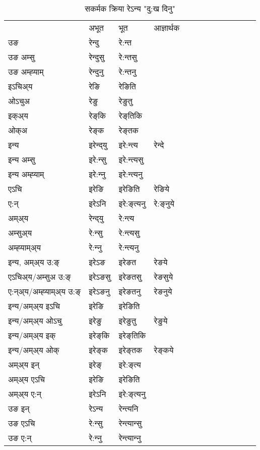 \begin{table}[H]
\label{eŋt.vt} \centering
\caption{सकर्मक क्रिया  रेऽन्य  "दु:ख दिनु"  }
\begin{tabular}{l|l|l|l|l|l|l|l|l|l|l|l|l}  \toprule
&अभूत & भूत & आज्ञार्थक \\ 
उङ &रेन्दु &रे:न्त \\ 
उङ अम्सु&रेन्दुसु &रे:न्तसु \\ 
उङ अम्ह्‍याम्&रेन्दुनु &रे:न्तनु \\ 
इऽचिअ्य &रेङि &रेङिति   \\ 
ओऽचुअ        &रेङु &रेङुतु   \\ 
इक्अ्य&रेङ्‌कि &रेङ्‌तिकि   \\ 
ओक्अ &रेङ्‌क &रेङ्‌तक   \\ 
इन्य & इरेन्द्‌यु  & इरे:न्त्य &रेन्दे  \\ 
इन्य अम्सु& इरे:न्सु  & इरे:न्त्यसु   \\ 
इन्य अम्ह्‍याम्& इरे:न्‍नु  & इरे:न्त्यनु   \\ 
एऽचि & इरेङि & इरेङिति &रेङिये    \\ 
ए:न् & इरेऽनि  & इरे:ङ्‌त्यनु &रे:ङ्‌नुये  \\ 
अम्अ्य & रेन्द्‌यु  & रे:न्त्य  \\ 
अम्सुअ्य & रे:न्सु & रे:न्त्यसु  \\ 
अम्ह्‍याम्अ्य & रे:न्‍नु  & रे:न्त्यनु \\ 
\midrule
इन्य, अम्अ्य उ:ङ्‌ &इरेऽङ &इरेङत &रेङये \\ 
एऽचिअ्य/अम्सुअ उ:ङ्‌ &इरेऽङसु &इरेङतसु &रेङसुये \\ 
ए:न्अ्य/अम्ह्‍याम्अ्य उ:ङ्‌ &इरेऽङनु &इरेङतनु &रेङनुये \\ 
इन्य/अम्अ्य इऽचि &इरेङि &इरेङिति    \\ 
इन्य/अम्अ्य ओऽचु &इरेङु &इरेङुतु  &रेङुये  \\ 
इन्य/अम्अ्य इक् &इरेङ्‌कि &इरेङ्‌तिकि   \\ 
इन्य/अम्अ्य ओक् &इरेङ्‌क &इरेङ्‌तक  &रेङ्‌कये  \\ 
अम्अ्य इन् & इरेङ्‌ & इरे:ङ्‌त्य   \\ 
अम्अ्य एऽचि & इरेङि & इरेङिति    \\ 
अम्अ्य ए:न् & इरेऽनि  & इरे:ङ्‌त्यनु  \\ 
\midrule
उङ इन् & रेऽन्य  & रेन्त्यनि  \\ 
उङ एऽचि & रे:न्सु  & रेन्त्यान्सु   \\ 
उङ ए:न्& रे:न्‍नु  & रेन्त्यान्‍नु   \\ 
\bottomrule
\end{tabular}
\end{table}


